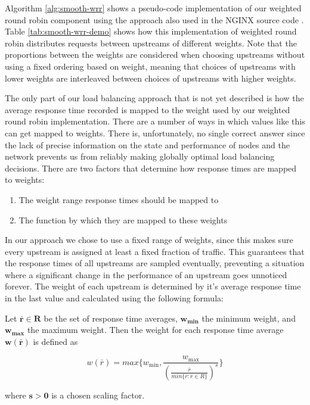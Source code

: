 \documentclass[draft,final]{vutinfth} %
\begin{document}
Algorithm \ref{alg:smooth-wrr} shows a pseudo-code implementation of our weighted round robin component using the approach also used in the NGINX source code \cite{nginx-wrr}.
Table \ref{tab:smooth-wrr-demo} shows how this implementation of weighted round robin distributes requests between upstreams of different weights. Note that the proportions between the weights are considered when choosing upstreams without using a fixed ordering based on weight, meaning that choices of upstreams with lower weights are interleaved between choices of upstreams with higher weights. %

The only part of our load balancing approach that is not yet described is how the average response time recorded is mapped to the weight used by our weighted round robin implementation.
There are a number of ways in which values like this can get mapped to weights.
There is, unfortunately, no single correct answer since the lack of precise information on the state and performance of nodes and the network prevents us from reliably making globally optimal load balancing decisions.
There are two factors that determine how response times are mapped to weights:
\begin{enumerate}
    \item The weight range response times should be mapped to
    \item The function by which they are mapped to these weights
\end{enumerate}

In our approach we chose to use a fixed range of weights, since this makes sure every upstream is assigned at least a fixed fraction of traffic.
This guarantees that the response times of all upstreams are sampled eventually, preventing a situation where a significant change in the performance of an upstream goes unnoticed forever.
The weight of each upstream is determined by it's average response time in the last value and calculated using the following formula:

Let $\mathbf{\bar{r} \in R}$ be the set of response time averages, $\mathbf{w_{\text{min}}}$ the minimum weight, and $\mathbf{w_{\text{max}}}$ the maximum weight. Then the weight for each response time average $\mathbf{w(\bar{r})}$ is defined as

\[ w(\bar{r}) = max\{w_{\text{min}}, \frac{w_{\text{max}}}{(\frac{\bar{r}}{min\{\bar{r}: \bar{r} \in R\}})^{s}}\} \]

where $\mathbf{s > 0}$ is a chosen scaling factor.
\end{document}
